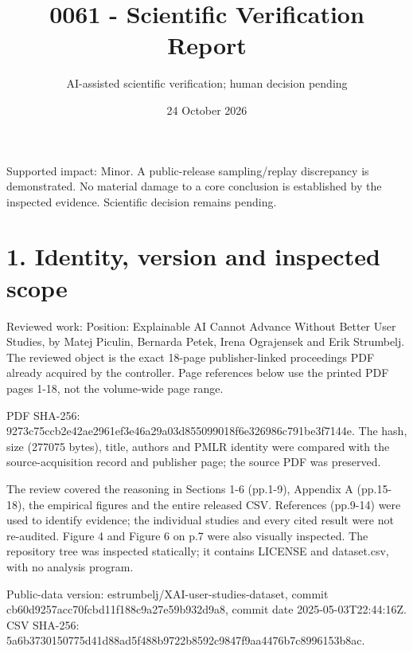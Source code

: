 \documentclass[10pt]{article}
\title{0061 - Scientific Verification Report}
\author{AI-assisted scientific verification; human decision pending}
\date{24 October 2026}
\begin{document}
\maketitle
Supported impact: Minor. A public-release sampling/replay discrepancy is demonstrated. No material damage to a core conclusion is established by the inspected evidence. Scientific decision remains pending.\par
\section*{1. Identity, version and inspected scope}
Reviewed work: Position: Explainable AI Cannot Advance Without Better User Studies, by Matej Piculin, Bernarda Petek, Irena Ograjensek and Erik Strumbelj. The reviewed object is the exact 18-page publisher-linked proceedings PDF already acquired by the controller. Page references below use the printed PDF pages 1-18, not the volume-wide page range.\par
PDF SHA-256: 9273c75ccb2e42ae2961ef3e46a29a03d855099018f6e326986c791be3f7144e. The hash, size (277075 bytes), title, authors and PMLR identity were compared with the source-acquisition record and publisher page; the source PDF was preserved.\par
The review covered the reasoning in Sections 1-6 (pp.1-9), Appendix A (pp.15-18), the empirical figures and the entire released CSV. References (pp.9-14) were used to identify evidence; the individual studies and every cited result were not re-audited. Figure 4 and Figure 6 on p.7 were also visually inspected. The repository tree was inspected statically; it contains LICENSE and dataset.csv, with no analysis program.\par
Public-data version: estrumbelj/XAI-user-studies-dataset, commit cb60d9257acc70fcbd11f188c9a27e59b932d9a8, commit date 2025-05-03T22:44:16Z. CSV SHA-256: 5a6b3730150775d41d88ad5f488b9722b8592c9847f9aa4476b7c8996153b8ac.\par
\end{document}
